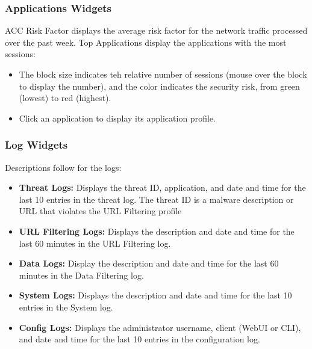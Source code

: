 \subsubsection{Applications Widgets}
ACC Risk Factor displays the average risk factor for the network traffic processed over the past week.
\newline
Top Applications display the applications with the most sessions:
\begin{itemize}
    \item The block size indicates teh relative number of sessions (mouse over the block to display the number), and the color indicates the security risk, from green (lowest) to red (highest).
    \item Click an application to display its application profile.
\end{itemize}

\subsubsection{Log Widgets}
Descriptions follow for the logs:
\begin{itemize}
    \item \textbf{Threat Logs:} Displays the threat ID, application, and date and time for the last 10 entries in the threat log. The threat ID is a malware description or URL that violates the URL Filtering profile
    \item \textbf{URL Filtering Logs:} Displays the description and date and time for the last 60 minutes in the URL Filtering log.
    \item \textbf{Data Logs:} Display the description and date and time for the last 60 minutes in the Data Filtering log.
    \item \textbf{System Logs:} Displays the description and date and time for the last 10 entries in the System log.
    \item \textbf{Config Logs:} Displays the administrator username, client (WebUI or CLI), and date and time for the last 10 entries in the configuration log.
\end{itemize}

